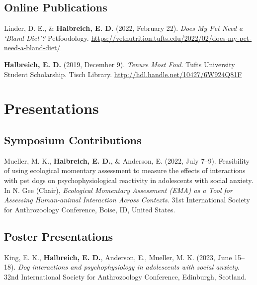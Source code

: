 \documentclass[10pt,a4paper,]{article}
\begin{document}
\hypertarget{online-publications}{%
\subsection{Online Publications}\label{online-publications}}

Linder, D. E., \& \textbf{Halbreich, E. D.} (2022, February 22).
\emph{Does My Pet Need a `Bland Diet'?} Petfoodology.
\url{https://vetnutrition.tufts.edu/2022/02/does-my-pet-need-a-bland-diet/}

\textbf{Halbreich, E. D.} (2019, December 9). \emph{Tenure Most Foul}.
Tufts University Student Scholarship. Tisch Library.
\url{http://hdl.handle.net/10427/6W924Q81F}

\endgroup

\hypertarget{presentations}{%
\section{Presentations}\label{presentations}}

\begingroup
\setlength{\parindent}{-0.5in}
\setlength{\leftskip}{0.5in}
\setlength{\parskip}{8pt}

\hypertarget{symposium-contributions}{%
\subsection{Symposium Contributions}\label{symposium-contributions}}

Mueller, M. K., \textbf{Halbreich, E. D.}, \& Anderson, E. (2022, July
7--9). Feasibility of using ecological momentary assessment to measure
the effects of interactions with pet dogs on psychophysiological
reactivity in adolescents with social anxiety. In N. Gee (Chair),
\emph{Ecological Momentary Assessment (EMA) as a Tool for Assessing
Human-animal Interaction Across Contexts}. 31st International Society
for Anthrozoology Conference, Boise, ID, United States.

\hypertarget{poster-presentations}{%
\subsection{Poster Presentations}\label{poster-presentations}}

King, E. K., \textbf{Halbreich, E. D.}, Anderson, E., Mueller, M. K.
(2023, June 15--18). \emph{Dog interactions and psychophysiology in
adolescents with social anxiety}. 32nd International Society for
Anthrozoology Conference, Edinburgh, Scotland.
\end{document}
